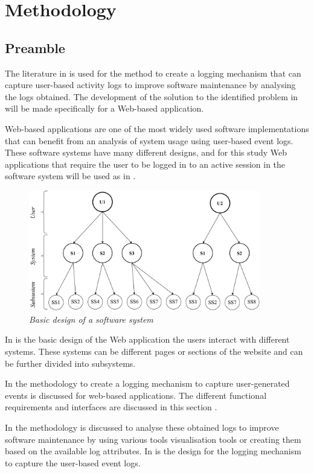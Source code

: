 \chapter{Methodology}
\label{chap:2}

\section{Preamble}\label{sec:ch2_preamble}
 The literature in  is used for the method to create a logging mechanism that can capture user-based activity logs to improve software maintenance by analysing the logs obtained. The development of the solution to the identified problem in  will be made specifically for a Web-based application.\par Web-based applications are one of the most widely used software implementations that can benefit from an analysis of system usage using user-based event logs. These software systems have many different designs, and for this study Web applications that require the user to be logged in to an active session in the software system will be used as in .

 \begin{figure}[!htb]
	\centering %
	\includegraphics[width=0.9\textwidth]{img/Chapter2/systemOverview/systemOverview.pdf}
	\caption[Basic design of a software system]
	{\textit{Basic design of a software system}}\label{fig:ch2_webSystemBasic}
\end{figure}
 
 In  is the basic design of the Web application the users interact with different systems. These systems can be different pages or sections of the website and can be further divided into subsystems. \par In  the methodology to create a logging mechanism to capture user-generated events is discussed for web-based applications. The different functional requirements and interfaces are discussed in this section \cite{Anish2015}.\par In  the methodology is discussed to analyse these obtained logs to improve software maintenance by using various tools visualisation tools or creating them based on the available log attributes. In  is the design for the logging mechanism to capture the user-based event logs.

